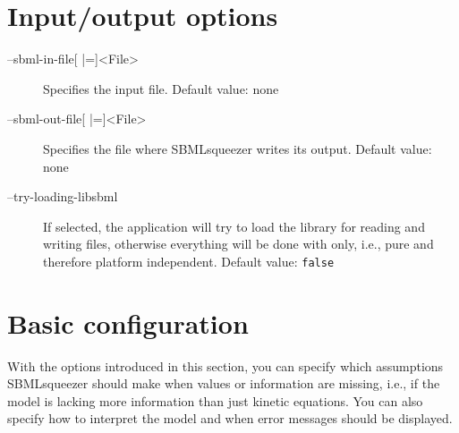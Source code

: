 \section{Input/output options}
\label{sec:IO_options}
\begin{description}
\item[--sbml-in-file{[} |={]}<File>]
  Specifies the \SBML input file.
  Default value: none

\item[--sbml-out-file{[} |={]}<File>]
  Specifies the file where SBMLsqueezer writes its \SBML output.
  Default value: none

\item[--try-loading-libsbml]
  If selected, the application will try to load the library \libSBML
  for reading and writing \SBML files, otherwise everything will
  be done with \JSBML only, i.e., pure \Java and therefore platform independent.
  Default value: \texttt{false}
\end{description}

\section{Basic configuration}
\label{sec:Basic_configuration}
With the options introduced in this section, you can specify which assumptions
SBMLsqueezer should make when values or information are missing, i.e., if the 
model is lacking more information than just kinetic equations. You can also
specify how to interpret the model and when error messages should be displayed.

